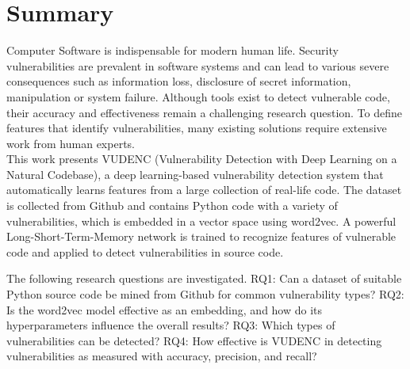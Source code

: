 \documentclass[
	a4paper,
	pagesize,
	pdftex,
	12pt,
	twoside, %
	BCOR=5mm, %
	ngerman,
	fleqn,
	final,
	]{scrartcl}
\begin{document}

\mitverteidigung %
\makeTitel
\tableofcontents
\newpage

\section{Summary}
Computer Software is indispensable for modern human life. Security vulnerabilities are prevalent in software systems and can lead to various severe consequences such as information loss, disclosure of secret information, manipulation or system failure. Although tools exist to detect vulnerable code, their accuracy and effectiveness remain a challenging research question. To define features that identify vulnerabilities, many existing solutions require extensive work from human experts.\\ %
This work presents VUDENC (Vulnerability Detection with Deep Learning on a Natural Codebase), a deep learning-based vulnerability detection system that automatically learns features from a large collection of real-life code. The dataset is collected from Github and contains Python code with a variety of vulnerabilities, which is embedded in a vector space using word2vec. A powerful Long-Short-Term-Memory network is trained to recognize features of vulnerable code and applied to detect vulnerabilities in source code. 

The following research questions are investigated. RQ1: Can a dataset of suitable Python source code be mined from Github for common vulnerability types? RQ2: Is the word2vec model effective as an embedding, and how do its hyperparameters influence the overall results? RQ3: Which types of vulnerabilities can be detected? RQ4: How effective is VUDENC in detecting vulnerabilities as measured with accuracy, precision, and recall? 
\end{document}
